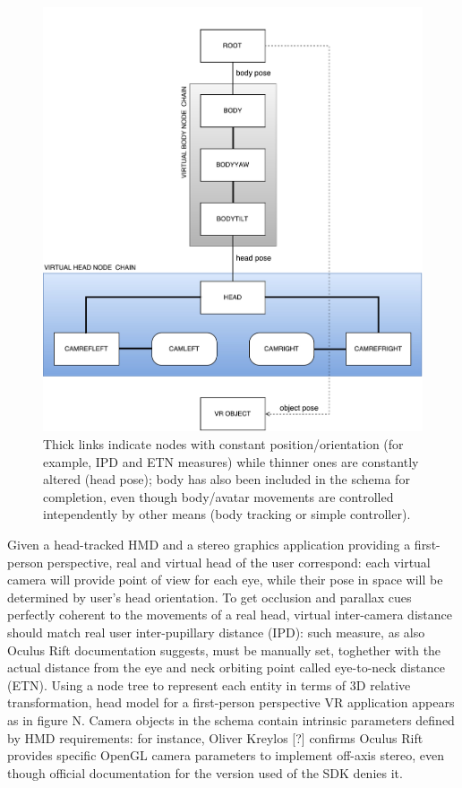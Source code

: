 \begin{figure}
\centering
\includegraphics[width=\linewidth]{schemas/classic-head-model_nodetree}
\caption{Thick links indicate nodes with constant position/orientation (for example, IPD and ETN measures) while thinner ones are constantly altered (head pose); body has also been included in the schema for completion, even though body/avatar movements are controlled intependently by other means (body tracking or simple controller).}
\label{fig:classic_head_model}
\end{figure}

Given a head-tracked HMD and a stereo graphics application providing a first-person perspective, real and virtual head of the user correspond: each virtual camera will provide point of view for each eye, while their pose in space will be determined by user's head orientation. To get occlusion and parallax cues perfectly coherent to the movements of a real head, virtual inter-camera distance should match real user inter-pupillary distance (IPD): such measure, as also Oculus Rift documentation suggests, must be manually set, toghether with the actual distance from the eye and neck orbiting point called eye-to-neck distance (ETN). Using a node tree to represent each entity in terms of 3D relative transformation, head model for a first-person perspective VR application appears as in figure N. Camera objects in the schema contain intrinsic parameters defined by HMD requirements: for instance, Oliver Kreylos [?] confirms Oculus Rift provides specific OpenGL camera parameters to implement off-axis stereo, even though official documentation for the version used of the SDK denies it.


